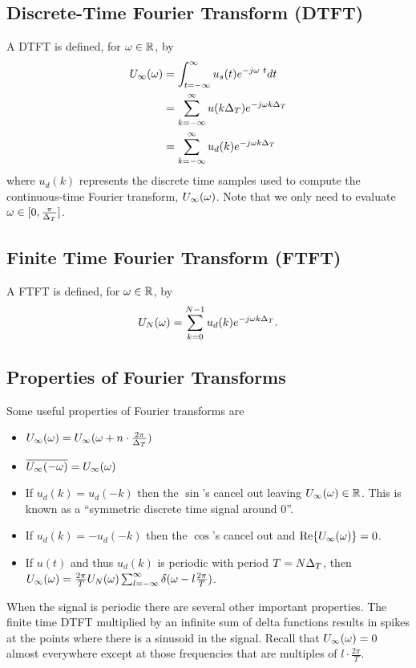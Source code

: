 \subsection{Discrete-Time Fourier Transform (DTFT)}
A DTFT is defined, for $\omega\in\mathbb{R}$, by
\begin{align*}
U_\infty(\omega) &= \int_{t=-\infty}^\infty u_s(t)e^{-j\omega\ t} dt \\
&= \sum_{k=-\infty}^\infty u(k\Delta_T) e^{-j\omega k\Delta_T} \\
&= \sum_{k=-\infty}^\infty u_d(k) e^{-j\omega k\Delta_T}
\end{align*}
where $u_d(k)$ represents the discrete time samples used to compute the continuous-time Fourier transform, $U_\infty(\omega)$.
Note that we only need to evaluate $\omega\in[0, \frac{\pi}{\Delta_T}]$.

\subsection{Finite Time Fourier Transform (FTFT)}
A FTFT is defined, for $\omega\in\mathbb{R}$, by
$$U_N(\omega) = \sum_{k=0}^{N-1} u_d(k) e^{-j\omega k\Delta_T}.$$

\subsection{Properties of Fourier Transforms}
Some useful properties of Fourier transforms are
\begin{itemize}
\item $U_\infty(\omega) = U_\infty(\omega + n\cdot \frac{2\pi}{\Delta_T})$
\item $\overline{U_\infty(-\omega)} = U_\infty(\omega)$
\item If $u_d(k) = u_d(-k)$ then the $\sin$'s cancel out leaving $U_\infty(\omega)\in\mathbb{R}$.
  This is known as a ``symmetric discrete time signal around $0$''.
\item If $u_d(k) = -u_d(-k)$ then the $\cos$'s cancel out and $\text{Re}\lbrace U_\infty(\omega)\rbrace = 0$.
\item If $u(t)$ and thus $u_d(k)$ is periodic with period $T=N\Delta_T$, then $U_\infty(\omega) = \frac{2\pi}{T}U_N(\omega) \sum_{l=-\infty}^\infty \delta(\omega-l\frac{2\pi}{T})$.
\end{itemize}
When the signal is periodic there are several other important properties.
The finite time DTFT multiplied by an infinite sum of delta functions results in spikes at the points where there is a sinusoid in the signal.
Recall that $U_\infty(\omega)=0$ almost everywhere except at those frequencies that are multiples of $l\cdot \frac{2\pi}{T}$.

